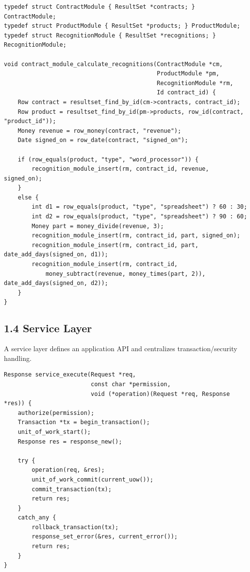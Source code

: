 \documentclass[11pt]{article}
\begin{document}
\begin{verbatim}
typedef struct ContractModule { ResultSet *contracts; } ContractModule;
typedef struct ProductModule { ResultSet *products; } ProductModule;
typedef struct RecognitionModule { ResultSet *recognitions; } RecognitionModule;

void contract_module_calculate_recognitions(ContractModule *cm,
                                            ProductModule *pm,
                                            RecognitionModule *rm,
                                            Id contract_id) {
    Row contract = resultset_find_by_id(cm->contracts, contract_id);
    Row product = resultset_find_by_id(pm->products, row_id(contract, "product_id"));
    Money revenue = row_money(contract, "revenue");
    Date signed_on = row_date(contract, "signed_on");

    if (row_equals(product, "type", "word_processor")) {
        recognition_module_insert(rm, contract_id, revenue, signed_on);
    }
    else {
        int d1 = row_equals(product, "type", "spreadsheet") ? 60 : 30;
        int d2 = row_equals(product, "type", "spreadsheet") ? 90 : 60;
        Money part = money_divide(revenue, 3);
        recognition_module_insert(rm, contract_id, part, signed_on);
        recognition_module_insert(rm, contract_id, part, date_add_days(signed_on, d1));
        recognition_module_insert(rm, contract_id,
            money_subtract(revenue, money_times(part, 2)), date_add_days(signed_on, d2));
    }
}
\end{verbatim}

\subsection{1.4 Service Layer}\label{service-layer}

A service layer defines an application API and centralizes
transaction/security handling.

\begin{verbatim}
Response service_execute(Request *req,
                         const char *permission,
                         void (*operation)(Request *req, Response *res)) {
    authorize(permission);
    Transaction *tx = begin_transaction();
    unit_of_work_start();
    Response res = response_new();

    try {
        operation(req, &res);
        unit_of_work_commit(current_uow());
        commit_transaction(tx);
        return res;
    }
    catch_any {
        rollback_transaction(tx);
        response_set_error(&res, current_error());
        return res;
    }
}
\end{verbatim}
\end{document}
